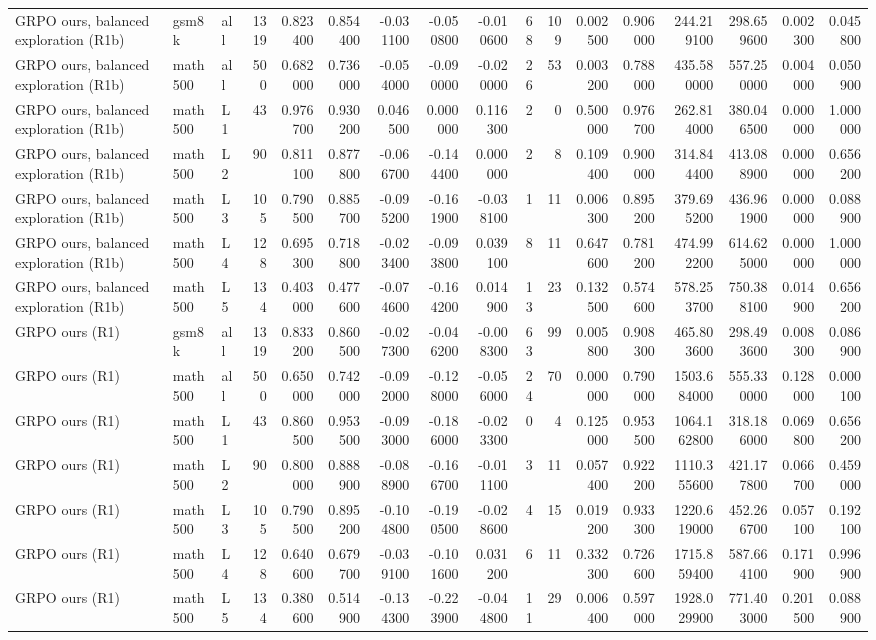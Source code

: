 \begin{table}
\begin{tabular}{lllrrrrrrrrrrrrrr}
GRPO ours, balanced exploration (R1b) & gsm8k & all & 1319 & 0.823400 & 0.854400 & -0.031100 & -0.050800 & -0.010600 & 68 & 109 & 0.002500 & 0.906000 & 244.219100 & 298.659600 & 0.002300 & 0.045800 \\
GRPO ours, balanced exploration (R1b) & math500 & all & 500 & 0.682000 & 0.736000 & -0.054000 & -0.090000 & -0.020000 & 26 & 53 & 0.003200 & 0.788000 & 435.580000 & 557.250000 & 0.004000 & 0.050900 \\
GRPO ours, balanced exploration (R1b) & math500 & L1 & 43 & 0.976700 & 0.930200 & 0.046500 & 0.000000 & 0.116300 & 2 & 0 & 0.500000 & 0.976700 & 262.814000 & 380.046500 & 0.000000 & 1.000000 \\
GRPO ours, balanced exploration (R1b) & math500 & L2 & 90 & 0.811100 & 0.877800 & -0.066700 & -0.144400 & 0.000000 & 2 & 8 & 0.109400 & 0.900000 & 314.844400 & 413.088900 & 0.000000 & 0.656200 \\
GRPO ours, balanced exploration (R1b) & math500 & L3 & 105 & 0.790500 & 0.885700 & -0.095200 & -0.161900 & -0.038100 & 1 & 11 & 0.006300 & 0.895200 & 379.695200 & 436.961900 & 0.000000 & 0.088900 \\
GRPO ours, balanced exploration (R1b) & math500 & L4 & 128 & 0.695300 & 0.718800 & -0.023400 & -0.093800 & 0.039100 & 8 & 11 & 0.647600 & 0.781200 & 474.992200 & 614.625000 & 0.000000 & 1.000000 \\
GRPO ours, balanced exploration (R1b) & math500 & L5 & 134 & 0.403000 & 0.477600 & -0.074600 & -0.164200 & 0.014900 & 13 & 23 & 0.132500 & 0.574600 & 578.253700 & 750.388100 & 0.014900 & 0.656200 \\
GRPO ours (R1) & gsm8k & all & 1319 & 0.833200 & 0.860500 & -0.027300 & -0.046200 & -0.008300 & 63 & 99 & 0.005800 & 0.908300 & 465.803600 & 298.493600 & 0.008300 & 0.086900 \\
GRPO ours (R1) & math500 & all & 500 & 0.650000 & 0.742000 & -0.092000 & -0.128000 & -0.056000 & 24 & 70 & 0.000000 & 0.790000 & 1503.684000 & 555.330000 & 0.128000 & 0.000100 \\
GRPO ours (R1) & math500 & L1 & 43 & 0.860500 & 0.953500 & -0.093000 & -0.186000 & -0.023300 & 0 & 4 & 0.125000 & 0.953500 & 1064.162800 & 318.186000 & 0.069800 & 0.656200 \\
GRPO ours (R1) & math500 & L2 & 90 & 0.800000 & 0.888900 & -0.088900 & -0.166700 & -0.011100 & 3 & 11 & 0.057400 & 0.922200 & 1110.355600 & 421.177800 & 0.066700 & 0.459000 \\
GRPO ours (R1) & math500 & L3 & 105 & 0.790500 & 0.895200 & -0.104800 & -0.190500 & -0.028600 & 4 & 15 & 0.019200 & 0.933300 & 1220.619000 & 452.266700 & 0.057100 & 0.192100 \\
GRPO ours (R1) & math500 & L4 & 128 & 0.640600 & 0.679700 & -0.039100 & -0.101600 & 0.031200 & 6 & 11 & 0.332300 & 0.726600 & 1715.859400 & 587.664100 & 0.171900 & 0.996900 \\
GRPO ours (R1) & math500 & L5 & 134 & 0.380600 & 0.514900 & -0.134300 & -0.223900 & -0.044800 & 11 & 29 & 0.006400 & 0.597000 & 1928.029900 & 771.403000 & 0.201500 & 0.088900 \\
\bottomrule
\end{tabular}
\end{table}
